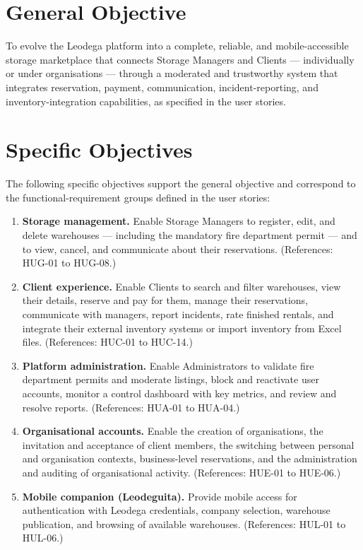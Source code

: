 \documentclass[11pt,a4paper,oneside]{report}
\begin{document}
\section{General Objective}

To evolve the Leodega platform into a complete, reliable, and mobile-accessible storage marketplace that connects Storage Managers and Clients --- individually or under organisations --- through a moderated and trustworthy system that integrates reservation, payment, communication, incident-reporting, and inventory-integration capabilities, as specified in the user stories.

\section{Specific Objectives}

The following specific objectives support the general objective and correspond to the functional-requirement groups defined in the user stories:

\begin{enumerate}
    \item \textbf{Storage management.} Enable Storage Managers to register, edit, and delete warehouses --- including the mandatory fire department permit --- and to view, cancel, and communicate about their reservations. (References: HUG-01 to HUG-08.)
    \item \textbf{Client experience.} Enable Clients to search and filter warehouses, view their details, reserve and pay for them, manage their reservations, communicate with managers, report incidents, rate finished rentals, and integrate their external inventory systems or import inventory from Excel files. (References: HUC-01 to HUC-14.)
    \item \textbf{Platform administration.} Enable Administrators to validate fire department permits and moderate listings, block and reactivate user accounts, monitor a control dashboard with key metrics, and review and resolve reports. (References: HUA-01 to HUA-04.)
    \item \textbf{Organisational accounts.} Enable the creation of organisations, the invitation and acceptance of client members, the switching between personal and organisation contexts, business-level reservations, and the administration and auditing of organisational activity. (References: HUE-01 to HUE-06.)
    \item \textbf{Mobile companion (Leodeguita).} Provide mobile access for authentication with Leodega credentials, company selection, warehouse publication, and browsing of available warehouses. (References: HUL-01 to HUL-06.)
\end{enumerate}
\end{document}
